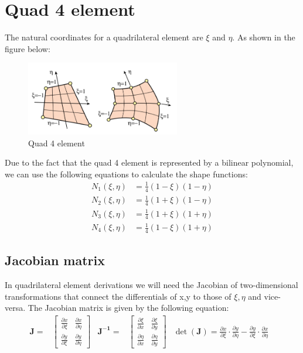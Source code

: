 \documentclass{article}  %
\begin{document}
\section{Quad 4 element}
The natural coordinates for a quadrilateral element are $\xi$ and $\eta$. As shown in the figure below:
\begin{figure}[h]
    \centering
    \includegraphics[width=0.6\textwidth]{Graphics/quad_4.PNG}
    \caption{Quad 4 element}
    \label{fig:quad_4_element}
\end{figure}

Due to the fact that the quad 4 element is represented by a bilinear polynomial, we can use the following equations to calculate the shape functions:
\begin{align}
  N_1(\xi,\eta) &= \frac{1}{4} (1-\xi)(1-\eta) \\
  N_2(\xi,\eta) &= \frac{1}{4} (1+\xi)(1-\eta) \\
  N_3(\xi,\eta) &= \frac{1}{4} (1+\xi)(1+\eta) \\
  N_4(\xi,\eta) &= \frac{1}{4} (1-\xi)(1+\eta)
\end{align}

\subsection{Jacobian matrix}
In quadrilateral element derivations we will need the Jacobian of two-dimensional transformations that connect the differentials of {x,y} to those of {$\xi, \eta$} and vice-versa.
The Jacobian matrix is given by the following equation:
\begin{align}
  \mathbf{J}=
  &  \begin{bmatrix}
    \frac{\partial x}{\partial \xi} & \frac{\partial x}{\partial \eta} \\
    \frac{\partial y}{\partial \xi} & \frac{\partial y}{\partial \eta}
  \end{bmatrix} 
 &
 \mathbf{J^{-1}}=
  &  \begin{bmatrix}
    \frac{\partial \xi}{\partial x} & \frac{\partial \xi}{\partial y} \\
    \frac{\partial \eta}{\partial x} & \frac{\partial \eta}{\partial y}
  \end{bmatrix}
  &
  \det(\mathbf{J}) = 
\frac{\partial x}{\partial \xi} \cdot \frac{\partial y}{\partial \eta} - \frac{\partial y}{\partial \xi} \cdot \frac{\partial x}{\partial \eta}
&
\end{align}
\end{document}
